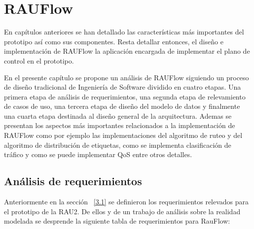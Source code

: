 \chapter{RAUFlow}
\label{Capítulo 5}

\ifpdf
    \graphicspath{{Chapter5/Figs/Raster/}{Chapter5/Figs/PDF/}{Chapter5/Figs/}}
\else
    \graphicspath{{Chapter5/Figs/Vector/}{Chapter5/Figs/}}
\fi

En cap\'itulos anteriores se han detallado las caracter\'isticas m\'as importantes del prototipo así como sus componentes. Resta detallar entonces, el dise\~no e implementaci\'on de RAUFlow la aplicaci\'on encargada de implementar el plano de control en el prototipo. 

En el presente cap\'itulo se propone un an\'alisis de RAUFlow siguiendo un proceso de dise\~no tradicional de Ingenier\'ia de Software dividido en cuatro etapas. Una primera etapa de an\'alisis de requerimientos, una segunda etapa de relevamiento de casos de uso, una tercera etapa de dise\~no del modelo de datos y finalmente una cuarta etapa destinada al dise\~no general de la arquitectura. Ademas se presentan los aspectos m\'as importantes relacionados a la implementaci\'on de RAUFlow como por ejemplo las implementaciones del algoritmo de ruteo y del algoritmo de distribución de etiquetas, como se implementa clasificaci\'on de tr\'afico y como se puede implementar QoS entre otros detalles. 

\section[An\'alisi de requerimientos]{An\'alisis de requerimientos}
\label{section5.1}

Anteriormente en la sección ~\ref{3.1} se definieron los requerimientos relevados para el prototipo de la RAU2. De ellos y de un trabajo de an\'alisis sobre la realidad modelada se desprende la siguiente tabla de requerimientos para RauFlow:

